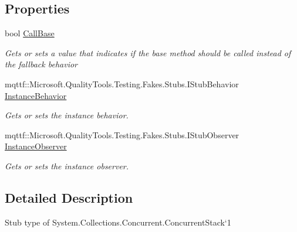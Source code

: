 \subsection*{Properties}
\begin{DoxyCompactItemize}
\item 
bool \hyperlink{class_system_1_1_collections_1_1_concurrent_1_1_fakes_1_1_stub_concurrent_stack_3_01_t_01_4_a89db4971588f936522cb343145a10c2a}{Call\-Base}
\begin{DoxyCompactList}\small\item\em Gets or sets a value that indicates if the base method should be called instead of the fallback behavior\end{DoxyCompactList}\item 
mqttf\-::\-Microsoft.\-Quality\-Tools.\-Testing.\-Fakes.\-Stubs.\-I\-Stub\-Behavior \hyperlink{class_system_1_1_collections_1_1_concurrent_1_1_fakes_1_1_stub_concurrent_stack_3_01_t_01_4_a0a1de162e182ba8f3188bd122c797f81}{Instance\-Behavior}
\begin{DoxyCompactList}\small\item\em Gets or sets the instance behavior.\end{DoxyCompactList}\item 
mqttf\-::\-Microsoft.\-Quality\-Tools.\-Testing.\-Fakes.\-Stubs.\-I\-Stub\-Observer \hyperlink{class_system_1_1_collections_1_1_concurrent_1_1_fakes_1_1_stub_concurrent_stack_3_01_t_01_4_a16abd142a71a91098efdda8f8da91ef0}{Instance\-Observer}
\begin{DoxyCompactList}\small\item\em Gets or sets the instance observer.\end{DoxyCompactList}\end{DoxyCompactItemize}


\subsection{Detailed Description}
Stub type of System.\-Collections.\-Concurrent.\-Concurrent\-Stack`1



